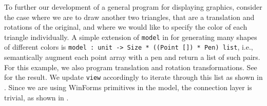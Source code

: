 \documentclass[fsharpNotes.tex]{subfiles}
\begin{document}
To further our development of a general program for displaying graphics, consider the case where we are to draw another two triangles, that are a translation and rotations of the original, and where we would like to specify the color of each triangle individually. A simple extension of \lstinline{model} in  for generating many shapes of different colors is \lstinline{model : unit -> Size * ((Point []) * Pen) list}, i.e., semantically augment each point array with a pen and return a list of such pairs. For this example, we also program translation and rotation transformations. See  for the result.
%
%
We update \lstinline{view} accordingly to iterate through this list as shown in .
%
%
Since we are using WinForms primitives in the model, the connection layer is trivial, as shown in .
%

\end{document}

